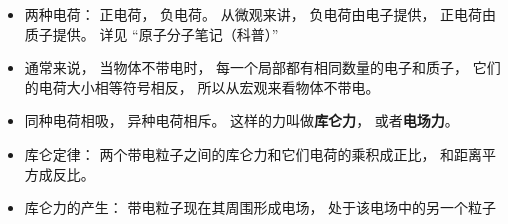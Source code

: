 
\begin{issues}
\issueDraft
\end{issues}

\begin{itemize}
\item 两种电荷： 正电荷， 负电荷。 从微观来讲， 负电荷由电子提供， 正电荷由质子提供。 详见 “原子分子笔记（科普）”
\item 通常来说， 当物体不带电时， 每一个局部都有相同数量的电子和质子， 它们的电荷大小相等符号相反， 所以从宏观来看物体不带电。
\item 同种电荷相吸， 异种电荷相斥。 这样的力叫做\textbf{库仑力}， 或者\textbf{电场力}。
\item 库仑定律： 两个带电粒子之间的库仑力和它们电荷的乘积成正比， 和距离平方成反比。
\item 库仑力的产生： 带电粒子现在其周围形成电场， 处于该电场中的另一个粒子
\end{itemize}
